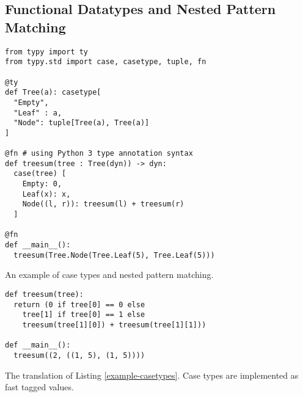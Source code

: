 \documentclass{sigplanconf}
\begin{document}
\subsection{Functional Datatypes and Nested Pattern Matching}
\begin{codelisting}[t]
\begin{lstlisting}
from typy import ty
from typy.std import case, casetype, tuple, fn

@ty
def Tree(a): casetype[
  "Empty",
  "Leaf" : a,
  "Node": tuple[Tree(a), Tree(a)]
]

@fn # using Python 3 type annotation syntax
def treesum(tree : Tree(dyn)) -> dyn:
  case(tree) [
    Empty: 0,
    Leaf(x): x,
    Node((l, r)): treesum(l) + treesum(r)
  ]

@fn
def __main__():
  treesum(Tree.Node(Tree.Leaf(5), Tree.Leaf(5)))
\end{lstlisting}
\caption{An example of case types and nested pattern matching.}
\label{example-casetypes}
\end{codelisting}
\begin{codelisting}[t]
\begin{lstlisting}
def treesum(tree):
  return (0 if tree[0] == 0 else 
    tree[1] if tree[0] == 1 else 
    treesum(tree[1][0]) + treesum(tree[1][1]))

def __main__():
  treesum((2, ((1, 5), (1, 5))))
\end{lstlisting}
\caption{The translation of Listing \ref{example-casetypes}. Case types are implemented as fast tagged values.}
\label{example-casetypes-out}
\end{codelisting}
\end{document}

